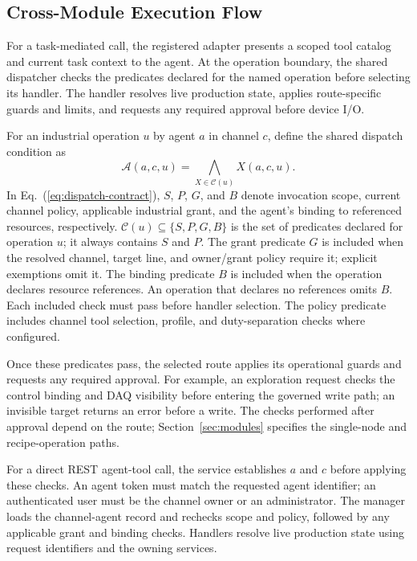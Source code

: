 \documentclass[journal]{IEEEtran}
\begin{document}
\subsection{Cross-Module Execution Flow}
\label{sec:executionflow}
For a task-mediated call, the registered adapter presents a scoped tool
catalog and current task context to the agent. At the operation boundary, the
shared dispatcher checks the predicates declared for the named operation
before selecting its handler. The handler resolves live production state,
applies route-specific guards and limits, and requests any required approval
before device I/O.

For an industrial operation $u$ by agent $a$ in channel $c$, define the
shared dispatch condition as
\begin{equation}
\mathcal{A}(a,c,u)=\bigwedge_{X\in\mathcal{C}(u)}X(a,c,u).
\label{eq:dispatch-contract}
\end{equation}
In Eq.~(\ref{eq:dispatch-contract}), $S$, $P$, $G$, and $B$ denote invocation scope, current channel policy,
applicable industrial grant, and the agent's binding to referenced resources,
respectively. $\mathcal{C}(u)\subseteq\{S,P,G,B\}$ is the set of predicates
declared for operation $u$; it always contains $S$ and $P$. The grant predicate
$G$ is included when the resolved channel, target line, and owner/grant policy
require it; explicit exemptions omit it. The binding predicate $B$ is included
when the operation declares resource references. An operation that declares
no references omits $B$. Each included check must pass before handler
selection. The policy predicate includes channel tool selection, profile, and duty-separation checks where
configured.

Once these predicates pass, the selected route applies its operational
guards and requests any required approval. For example, an exploration request checks
the control binding and DAQ visibility before entering the governed write
path; an invisible target returns an error before a write. The checks performed
after approval depend on the route; Section~\ref{sec:modules} specifies the
single-node and recipe-operation paths.

For a direct REST agent-tool call, the service establishes $a$ and $c$ before applying
these checks. An agent token must match the requested agent identifier; an
authenticated user must be the channel owner or an administrator. The manager
loads the channel-agent record and rechecks scope and policy, followed by any
applicable grant and binding checks. Handlers resolve live production state
using request identifiers and the owning services.
\end{document}
